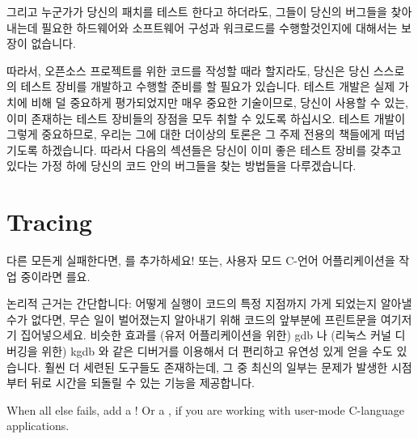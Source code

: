 그리고 누군가가 당신의 패치를 테스트 한다고 하더라도, 그들이 당신의 버그들을
찾아내는데 필요한 하드웨어와 소프트웨어 구성과 워크로드를 수행할것인지에
대해서는 보장이 없습니다.

따라서, 오픈소스 프로젝트를 위한 코드를 작성할 때라 할지라도, 당신은 당신
스스로의 테스트 장비를 개발하고 수행할 준비를 할 필요가 있습니다.
테스트 개발은 실제 가치에 비해 덜 중요하게 평가되었지만 매우 중요한 기술이므로,
당신이 사용할 수 있는, 이미 존재하는 테스트 장비들의 장점을 모두 취할 수 있도록
하십시오.
테스트 개발이 그렇게 중요하므로, 우리는 그에 대한 더이상의 토론은 그 주제
전용의 책들에게 떠넘기도록 하겠습니다.
따라서 다음의 섹션들은 당신이 이미 좋은 테스트 장비를 갖추고 있다는 가정 하에
당신의 코드 안의 버그들을 찾는 방법들을 다루겠습니다.

\section{Tracing}
\label{sec:debugging:Tracing}

다른 모든게 실패한다면,  를 추가하세요!
또는, 사용자 모드 C-언어 어플리케이션을 작업 중이라면  를요.

논리적 근거는 간단합니다: 어떻게 실행이 코드의 특정 지점까지 가게 되었는지
알아낼 수가 없다면, 무슨 일이 벌어졌는지 알아내기 위해 코드의 앞부분에
프린트문을 여기저기 집어넣으세요.
비슷한 효과를 (유저 어플리케이션을 위한) gdb 나 (리눅스 커널 디버깅을 위한)
kgdb 와 같은 디버거를 이용해서 더 편리하고 유연성 있게 얻을 수도 있습니다.
훨씬 더 세련된 도구들도 존재하는데, 그 중 최신의 일부는 문제가 발생한 시점부터
뒤로 시간을 되돌릴 수 있는 기능을 제공합니다.
\iffalse

When all else fails, add a !
Or a , if you are working with user-mode C-language applications.


